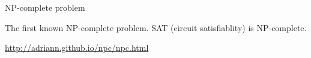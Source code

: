 \begin{frame}{NP-complete problem}
  \begin{exampleblock}{The first known NP-complete problem.}
    SAT (circuit satisfiablity) is NP-complete.
  \end{exampleblock}

\end{frame}
\begin{frame}

  \begin{center}
    \url{http://adriann.github.io/npc/npc.html}
  \end{center}
\end{frame}

